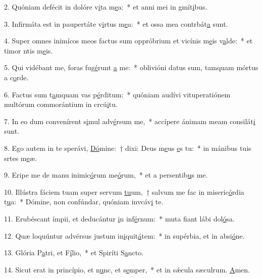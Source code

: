 2. Quóniam defécit in dolóre v\uline{i}ta m\uline{e}a:~* et anni mei in gmít\uline{i}bus.\par 
3. Infirmáta est in paupertáte v\uline{i}rtus m\uline{e}a:~* et ossa mea contrbát\uline{a} sunt.\par 
4. Super omnes inimícos meos factus sum oppróbrium et vicínis m\uline{e}is v\uline{a}lde:~* et timor ntis m\uline{e}is.\par 
5. Qui vidébant me, foras fug\uline{é}runt \uline{a} me:~* oblivióni datus sum, tamquam mórtus a c\uline{o}rde.\par 
6. Factus sum t\uline{a}mquam vas p\uline{é}rditum:~* quóniam audívi vituperatiónem multórum commorántium in crcú\uline{i}tu.\par 
7. In eo dum convenírent s\uline{i}mul adv\uline{é}rsum me,~* accípere ánimam meam consilát\uline{i} sunt.\par 
8. Ego autem in te sperávi, \uline{Dó}mine:~† dixi: Deus m\uline{e}us \uline{e}s tu:~* in mánibus tuis srtes m\uline{e}æ.\par 
9. Eripe me de manu inimic\uline{ó}rum me\uline{ó}rum,~* et a persentib\uline{u}s me.\par 
10. Illústra fáciem tuam super servum \uline{tu}um,~† salvum me fac in miseric\uline{ó}rdia t\uline{u}a:~* Dómine, non confúndar, quóniam invcáv\uline{i} te.\par 
11. Erubéscant ímpii, et deducántur \uline{i}n inf\uline{é}rnum:~* muta fiant lábi dol\uline{ó}sa.\par 
12. Quæ loquúntur advérsus justum in\uline{i}quit\uline{á}tem:~* in supérbia, et in absi\uline{ó}ne.\par 
13. Glória P\uline{a}tri, et F\uline{í}lio,~* et Spiríti S\uline{a}ncto.\par 
14. Sicut erat in princípio, et n\uline{u}nc, et s\uline{e}mper,~* et in sǽcula sæculrum. \uline{A}men.\par 
